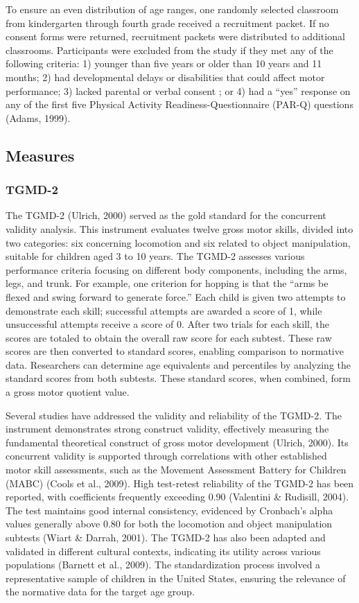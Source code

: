 \documentclass[
  man,
  colorlinks=true,linkcolor=blue,citecolor=blue,urlcolor=blue]{apa7}
\begin{document}
To ensure an even distribution of age ranges, one randomly selected
classroom from kindergarten through fourth grade received a recruitment
packet. If no consent forms were returned, recruitment packets were
distributed to additional classrooms. Participants were excluded from
the study if they met any of the following criteria: 1) younger than
five years or older than 10 years and 11 months; 2) had developmental
delays or disabilities that could affect motor performance; 3) lacked
parental or verbal consent ; or 4) had a ``yes'' response on any of the
first five Physical Activity Readiness-Questionnaire (PAR-Q) questions
(Adams, 1999).

\subsection{Measures}\label{measures}

\subsubsection{TGMD-2}\label{tgmd-2}

The TGMD-2 (Ulrich, 2000) served as the gold standard for the concurrent
validity analysis. This instrument evaluates twelve gross motor skills,
divided into two categories: six concerning locomotion and six related
to object manipulation, suitable for children aged 3 to 10 years. The
TGMD-2 assesses various performance criteria focusing on different body
components, including the arms, legs, and trunk. For example, one
criterion for hopping is that the ``arms be flexed and swing forward to
generate force.'' Each child is given two attempts to demonstrate each
skill; successful attempts are awarded a score of 1, while unsuccessful
attempts receive a score of 0. After two trials for each skill, the
scores are totaled to obtain the overall raw score for each subtest.
These raw scores are then converted to standard scores, enabling
comparison to normative data. Researchers can determine age equivalents
and percentiles by analyzing the standard scores from both subtests.
These standard scores, when combined, form a gross motor quotient value.

Several studies have addressed the validity and reliability of the
TGMD-2. The instrument demonstrates strong construct validity,
effectively measuring the fundamental theoretical construct of gross
motor development (Ulrich, 2000). Its concurrent validity is supported
through correlations with other established motor skill assessments,
such as the Movement Assessment Battery for Children (MABC) (Cools et
al., 2009). High test-retest reliability of the TGMD-2 has been
reported, with coefficients frequently exceeding 0.90 (Valentini \&
Rudisill, 2004). The test maintains good internal consistency, evidenced
by Cronbach's alpha values generally above 0.80 for both the locomotion
and object manipulation subtests (Wiart \& Darrah, 2001). The TGMD-2 has
also been adapted and validated in different cultural contexts,
indicating its utility across various populations (Barnett et al.,
2009). The standardization process involved a representative sample of
children in the United States, ensuring the relevance of the normative
data for the target age group.
\end{document}
